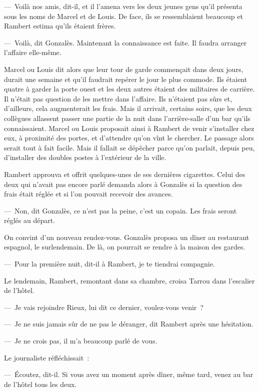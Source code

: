 \documentclass[french,twoside]{book} %
\begin{document}
— Voilà nos amis, dit-il, et il l’amena vers les deux jeunes gens qu’il présenta sous les noms de Marcel et de Louis. De face, ils se ressemblaient beaucoup et Rambert estima qu’ils étaient frères.\par
— Voilà, dit Gonzalès. Maintenant la connaissance est faite. Il faudra arranger l’affaire elle-même.\par
Marcel ou Louis dit alors que leur tour de garde commençait dans deux jours, durait une semaine et qu’il faudrait repérer le jour le plus commode. Ils étaient quatre à garder la porte ouest et les deux autres étaient des militaires de carrière. Il n’était pas question de les mettre dans l’affaire. Ils n’étaient pas sûrs et, d’ailleurs, cela augmenterait les frais. Mais il arrivait, certains soirs, que les deux collègues allassent passer une partie de la nuit dans l’arrière-salle d’un bar qu’ils connaissaient. Marcel ou Louis proposait ainsi à Rambert de venir s’installer chez eux, à proximité des portes, et d’attendre qu’on vînt le chercher. Le passage alors serait tout à fait facile. Mais il fallait se dépêcher parce qu’on parlait, depuis peu, d’installer des doubles postes à l’extérieur de la ville.\par
Rambert approuva et offrit quelques-unes de ses dernières cigarettes. Celui des deux qui n’avait pas encore parlé demanda alors à Gonzalès si la question des frais était réglée et si l’on pouvait recevoir des avances.\par
— Non, dit Gonzalès, ce n’est pas la peine, c’est un copain. Les frais seront réglés au départ.\par
On convint d’un nouveau rendez-vous. Gonzalès proposa un dîner au restaurant espagnol, le surlendemain. De là, on pourrait se rendre à la maison des gardes.\par
— Pour la première nuit, dit-il à Rambert, je te tiendrai compagnie.\par
Le lendemain, Rambert, remontant dans sa chambre, croisa Tarrou dans l’escalier de l’hôtel.\par
— Je vais rejoindre Rieux, lui dit ce dernier, voulez-vous venir ?\par
— Je ne suis jamais sûr de ne pas le déranger, dit Rambert après une hésitation.\par
— Je ne crois pas, il m’a beaucoup parlé de vous.\par
Le journaliste réfléchissait :\par
— Écoutez, dit-il. Si vous avez un moment après dîner, même tard, venez au bar de l’hôtel tous les deux.\par
\end{document}
